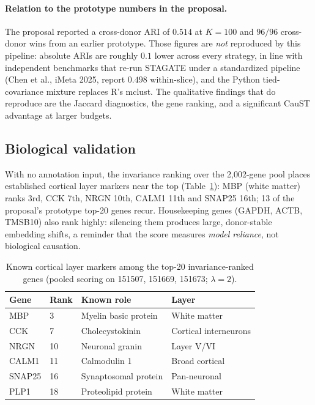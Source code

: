 \documentclass[11pt]{article}
\begin{document}
\paragraph{Relation to the prototype numbers in the proposal.}
The proposal reported a cross-donor ARI of $0.514$ at $K=100$ and $96/96$
cross-donor wins from an earlier prototype. Those figures are \emph{not}
reproduced by this pipeline: absolute ARIs are roughly $0.1$ lower across every
strategy, in line with independent benchmarks that re-run STAGATE under a
standardized pipeline (Chen et al., iMeta 2025, report $0.498$ within-slice),
and the Python tied-covariance mixture replaces R's mclust. The qualitative
findings that do reproduce are the Jaccard diagnostics, the gene ranking, and a
significant CauST advantage at larger budgets.

\subsection{Biological validation}
With no annotation input, the invariance ranking over the 2{,}002-gene pool
places established cortical layer markers near the top
(Table~\ref{tab:markers}): MBP (white matter) ranks 3rd, CCK 7th, NRGN 10th,
CALM1 11th and SNAP25 16th; 13 of the proposal's prototype top-20 genes recur.
Housekeeping genes (GAPDH, ACTB, TMSB10) also rank highly: silencing them
produces large, donor-stable embedding shifts, a reminder that the score
measures \emph{model reliance}, not biological causation.

\begin{table}[t]
\centering
\caption{Known cortical layer markers among the top-20 invariance-ranked genes
(pooled scoring on 151507, 151669, 151673; $\lambda=2$).}
\label{tab:markers}
\begin{tabular}{llll}
\toprule
Gene & Rank & Known role & Layer \\
\midrule
MBP & 3 & Myelin basic protein & White matter \\
CCK & 7 & Cholecystokinin & Cortical interneurons \\
NRGN & 10 & Neuronal granin & Layer V/VI \\
CALM1 & 11 & Calmodulin 1 & Broad cortical \\
SNAP25 & 16 & Synaptosomal protein & Pan-neuronal \\
PLP1 & 18 & Proteolipid protein & White matter \\
\bottomrule
\end{tabular}
\end{table}
\end{document}

